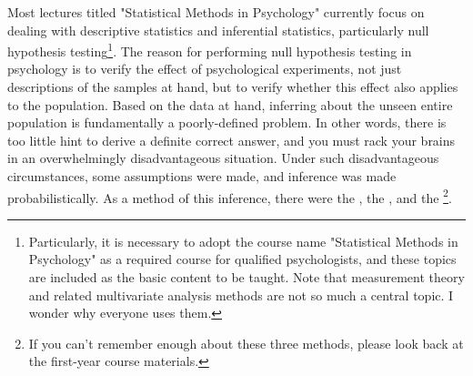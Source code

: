 \documentclass{ltjsbook}
\begin{document}
Most lectures titled "Statistical Methods in Psychology" currently focus on dealing with descriptive statistics and inferential statistics, particularly null hypothesis testing\footnote{Particularly, it is necessary to adopt the course name "Statistical Methods in Psychology" as a required course for qualified psychologists, and these topics are included as the basic content to be taught. Note that measurement theory and related multivariate analysis methods are not so much a central topic. I wonder why everyone uses them.}. The reason for performing null hypothesis testing in psychology is to verify the effect of psychological experiments, not just descriptions of the samples at hand, but to verify whether this effect also applies to the population. Based on the data at hand, inferring about the unseen entire population is fundamentally a poorly-defined problem. In other words, there is too little hint to derive a definite correct answer, and you must rack your brains in an overwhelmingly disadvantageous situation. Under such disadvantageous circumstances, some assumptions were made, and inference was made probabilistically. As a method of this inference, there were the , the , and the \footnote{If you can't remember enough about these three methods, please look back at the first-year course materials.}.
\end{document}
